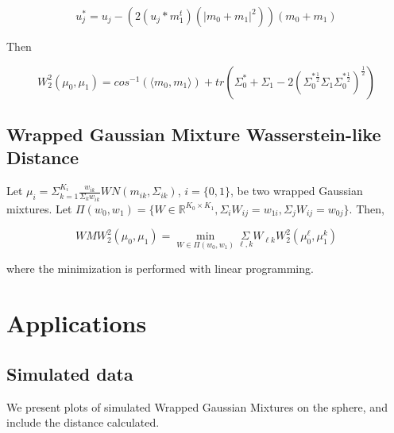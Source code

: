 \documentclass[]{article}
\begin{document}
\begin{equation*}
	u_j^{*} = u_j - (2(u_j*m_1^t)(|m_0 +m_1|^2))(m_0 + m_1)
\end{equation*} 

Then 

\begin{equation*}
	W_2^2(\mu_0,\mu_1) = cos^{-1}(\langle m_0,m_1 \rangle) + tr(\Sigma_0^* + \Sigma_1 - 2 (\Sigma_0^{*\frac{1}{2}} \Sigma_1 \Sigma_0^{*\frac{1}{2}})^{\frac{1}{2}}) 
\end{equation*}

\subsection{Wrapped Gaussian Mixture Wasserstein-like Distance}

Let $\mu_i = \Sigma_{k=1}^{K_i} \frac{w_{ik}}{\Sigma_k w_{ik}}WN(m_{ik},\Sigma_{ik})$, $i = \{0, 1\}$, be two wrapped Gaussian mixtures. Let $\Pi(w_0, w_1) = \{ W \in \mathbb{R}^{K_0 \times K_1}, \Sigma_i W_{ij} = w_{1i},\Sigma_j W_{ij} = w_{0j}\}$. Then,

%
%

\begin{equation}\label{eq: mixture distance}
	WMW_2^2(\mu_0,\mu_1) = \underset{W \in \Pi(w_0,w_1)}{\min}  \underset{{\ell, k}}{\Sigma} W_{\ell k} W_2^2(\mu_0^\ell,\mu_1^k)
\end{equation} 

where the minimization is performed with linear programming. 

\section{Applications}\label{section: applications}

\subsection{Simulated data}

We present plots of simulated Wrapped Gaussian Mixtures on the sphere, and include the distance calculated. 
\end{document}
